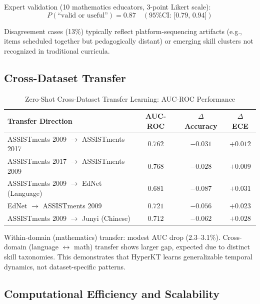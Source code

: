 \documentclass[preprint,12pt]{elsarticle}
\begin{document}
Expert validation (10 mathematics educators, 3-point Likert scale):
\begin{equation}
P(\text{``valid or useful''}) = 0.87 \quad (\text{95\% CI: [0.79, 0.94]})
\end{equation}

Disagreement cases (13\%) typically reflect platform-sequencing artifacts (e.g., items scheduled together but pedagogically distant) or emerging skill clusters not recognized in traditional curricula.

\subsection{Cross-Dataset Transfer}

\begin{table}[H]\centering
\caption{Zero-Shot Cross-Dataset Transfer Learning: AUC-ROC Performance}\label{tab:transfer}
\small
\begin{tabularx}{\linewidth}{@{\extracolsep{\fill}}lccc@{}}\toprule
\textbf{Transfer Direction} & \textbf{AUC-ROC} & \textbf{$\Delta$ Accuracy} & \textbf{$\Delta$ ECE}\\\midrule
ASSISTments 2009 $\to$ ASSISTments 2017 & $0.762$ & $-0.031$ & $+0.012$\\
ASSISTments 2017 $\to$ ASSISTments 2009 & $0.768$ & $-0.028$ & $+0.009$\\
ASSISTments 2009 $\to$ EdNet (Language) & $0.681$ & $-0.087$ & $+0.031$\\
EdNet $\to$ ASSISTments 2009 & $0.721$ & $-0.056$ & $+0.023$\\
ASSISTments 2009 $\to$ Junyi (Chinese) & $0.712$ & $-0.062$ & $+0.028$\\
\bottomrule\end{tabularx}
\end{table}

Within-domain (mathematics) transfer: modest AUC drop (2.3--3.1\%). Cross-domain (language $\leftrightarrow$ math) transfer shows larger gap, expected due to distinct skill taxonomies. This demonstrates that HyperKT learns generalizable temporal dynamics, not dataset-specific patterns.

\subsection{Computational Efficiency and Scalability}
\end{document}
